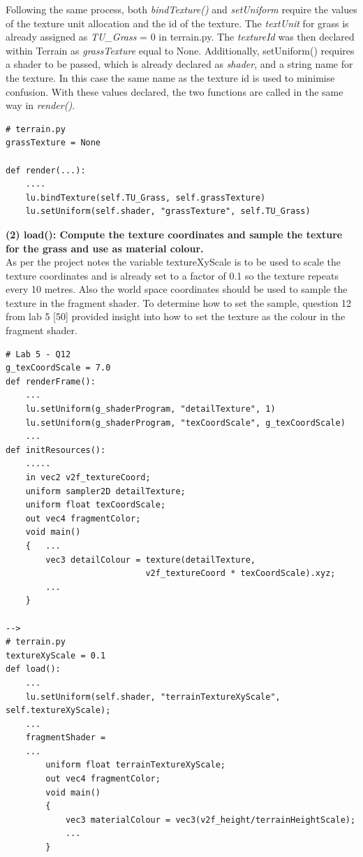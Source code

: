 \documentclass[a4 paper, 12pt]{article}
\begin{document}
Following the same process, both \textit{bindTexture()} and \textit{setUniform} require the values of the texture unit allocation and the id of the texture. The \textit{textUnit} for grass is already assigned as \textit{TU\_Grass} = 0 in terrain.py. The \textit{textureId} was then declared within Terrain as \textit{grassTexture} equal to None. Additionally, setUniform() requires a shader to be passed, which is already declared as \textit{shader}, and a string name for the texture. In this case the same name as the texture id is used to minimise confusion. With these values declared, the two functions are called in the same way in \textit{render()}.
    \begin{lstlisting} 
# terrain.py
grassTexture = None

def render(...):
    ....
    lu.bindTexture(self.TU_Grass, self.grassTexture)
    lu.setUniform(self.shader, "grassTexture", self.TU_Grass)        
    \end{lstlisting}

\textbf{(2) load(): Compute the texture coordinates and sample the texture for the grass and use as material colour.} \\
As per the project notes the variable textureXyScale is to be used to scale the texture coordinates and is already set to a factor of 0.1 so the texture repeats every 10 metres. Also the world space coordinates should be used to sample the texture in the fragment shader. To determine how to set the sample, question 12 from lab 5 [50] provided insight into how to set the texture as the colour in the fragment shader.
\begin{lstlisting}
# Lab 5 - Q12  
g_texCoordScale = 7.0
def renderFrame():
    ...
    lu.setUniform(g_shaderProgram, "detailTexture", 1)
    lu.setUniform(g_shaderProgram, "texCoordScale", g_texCoordScale)
    ...
def initResources():
    .....         
    in vec2 v2f_textureCoord;
    uniform sampler2D detailTexture; 
    uniform float texCoordScale; 
    out vec4 fragmentColor;
    void main() 
    {   ...     
        vec3 detailColour = texture(detailTexture, 
                            v2f_textureCoord * texCoordScale).xyz;      
        ...
    }   
   
-->
# terrain.py
textureXyScale = 0.1
def load():
    ...
    lu.setUniform(self.shader, "terrainTextureXyScale", self.textureXyScale);
    ...
    fragmentShader = 
    ...
        uniform float terrainTextureXyScale;
        out vec4 fragmentColor;
        void main()
        {
            vec3 materialColour = vec3(v2f_height/terrainHeightScale);
            ...
        }
\end{lstlisting}
\end{document}
